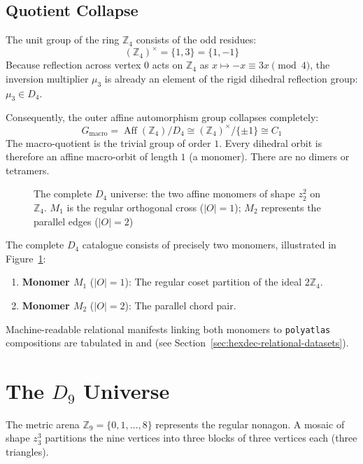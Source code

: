 \subsection{Quotient Collapse}

The unit group of the ring $\mathbb{Z}_4$ consists of the odd residues:
\[
(\mathbb{Z}_4)^\times = \{1, 3\} = \{1, -1\}
\]
Because reflection across vertex $0$ acts on $\mathbb{Z}_4$ as $x \mapsto -x \equiv 3x \pmod 4$, the inversion multiplier $\mu_3$ is already an element of the rigid dihedral reflection group: $\mu_3 \in D_4$.

Consequently, the outer affine automorphism group collapses completely:
\[
G_{\text{macro}} = \operatorname{Aff}(\mathbb{Z}_4) / D_4 \cong (\mathbb{Z}_4)^\times / \{\pm 1\} \cong C_1
\]
The macro-quotient is the trivial group of order $1$. Every dihedral orbit is therefore an affine macro-orbit of length $1$ (a monomer). There are no dimers or tetramers.

\begin{figure}[htbp]
\centering

\caption{\label{fig:d4-universe}The complete $D_4$ universe: the two affine monomers of shape $z_2^2$ on $\mathbb{Z}_4$. $M_1$ is the regular orthogonal cross ($|O|=1$); $M_2$ represents the parallel edges ($|O|=2$)}
\end{figure}

The complete $D_4$ catalogue consists of precisely two monomers, illustrated in Figure~\ref{fig:d4-universe}:
\begin{enumerate}
    \item \textbf{Monomer $M_1$} ($|O|=1$): The regular coset partition of the ideal $2\mathbb{Z}_4$.
    \item \textbf{Monomer $M_2$} ($|O|=2$): The parallel chord pair.
\end{enumerate}
Machine-readable relational manifests linking both monomers to \texttt{polyatlas} compositions are tabulated in  and  (see Section~\ref{sec:hexdec-relational-datasets}).

\section{The \texorpdfstring{$D_9$}{D9} Universe}
\label{sec:d9-universe}

The metric arena $\mathbb{Z}_9 = \{0, 1, \dots, 8\}$ represents the regular nonagon. A mosaic of shape $z_3^3$ partitions the nine vertices into three blocks of three vertices each (three triangles).

